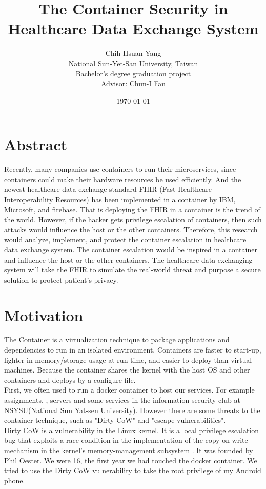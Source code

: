 \documentclass[12pt,a4paper]{article}
\title{{The Container Security in Healthcare Data Exchange System}}
\author{Chih-Hsuan Yang\\
National Sun-Yet-San University, Taiwan \\
Bachelor's degree graduation project \\
Advisor: Chun-I Fan
}
\date{\today}
\begin{document}
\section{Abstract}
Recently, many companies use containers to run their microservices, since containers could
make their hardware resources be used efficiently. And the newest healthcare data exchange
standard FHIR (Fast Healthcare Interoperability Resources) \cite{FHIR_home} has been implemented
in a container by IBM, Microsoft, and firebase. That is deploying the FHIR in a container is the
trend of the world. However, if the hacker gets privilege escalation of containers, then
such attacks would influence the host or the other containers. Therefore, this research would
analyze, implement, and protect the container escalation in healthcare data exchange system.
The container escalation would be inspired in a container and influence the host or the
other containers. The healthcare data exchanging system will take the FHIR to simulate
the real-world threat and purpose a secure solution to protect patient's privacy.


\section{Motivation}
The Container is a virtualization technique to package applications and dependencies to run in
an isolated environment. Containers are faster to start-up, lighter in memory/storage usage
at run time, and easier to deploy than virtual machines. Because the container shares the
kernel with the host OS and other containers and deploys by a configure file.\\
First, we often used to run a docker container to host our services. For example assignments,
, servers and some services in the information security club at NSYSU(National Sun Yat-sen University).
However there are some threats to the container technique, such as "Dirty CoW" \cite{Dirty_CoW}
and "escape vulnerabilities".\\

Dirty CoW is a vulnerability in the Linux kernel. It is a local privilege escalation bug
that exploits a race condition in the implementation of the copy-on-write mechanism in the
kernel's memory-management subsystem \cite{Dirty_CoW_wiki}. It was founded by Phil Oester. We
were 16, the first year we had touched the docker container. We tried to use the Dirty CoW
vulnerability to take the root privilege of my Android phone.\\
\end{document}
